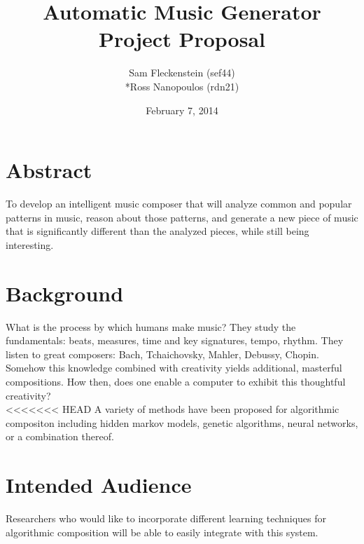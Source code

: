 \documentclass{article}
\begin{document}
\clearpage
{}
\begin{center}
\begin{minipage}{.6\textwidth}

\title{Automatic Music Generator \\ \vspace{2 pt} \Large{Project Proposal}}
\author{Sam Fleckenstein (sef44)\\*Ross Nanopoulos (rdn21)}
\date{February 7, 2014}
\maketitle

\end{minipage}
\end{center}
\clearpage

\tableofcontents
\newpage

\section{Abstract}
To develop an intelligent music composer that will analyze common and popular patterns in music, reason about those patterns, and generate a new piece of music that is significantly different than the analyzed pieces, while still being interesting.

\section{Background}
What is the process by which humans make music?  They study the fundamentals: beats, measures, time and key signatures, tempo, rhythm.  They listen to great composers: Bach, Tchaichovsky, Mahler, Debussy, Chopin.  Somehow this knowledge combined with creativity yields additional, masterful compositions.  How then, does one enable a computer to exhibit this thoughtful creativity?
\\
<<<<<<< HEAD
A variety of methods have been proposed for algorithmic compositon including hidden markov models, genetic algorithms, neural networks, or a combination thereof.

\section{Intended Audience}
Researchers who would like to incorporate different learning techniques for algorithmic composition will be able to easily integrate with this system.
\end{document}
